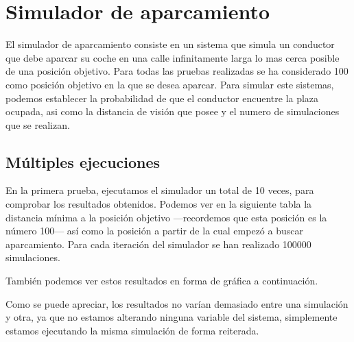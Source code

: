 \chapter{Simulador de aparcamiento}
El simulador de aparcamiento consiste en un sistema que simula un conductor que debe aparcar su coche en una calle infinitamente larga lo mas cerca posible de una posición objetivo. Para todas las pruebas realizadas se ha considerado 100 como posición objetivo en la que se desea aparcar. Para simular este sistemas, podemos establecer la probabilidad de que el conductor encuentre la plaza ocupada, asi como la distancia de visión que posee y el numero de simulaciones que se realizan.
\section{Múltiples ejecuciones}
En la primera prueba, ejecutamos el simulador un total de 10 veces, para comprobar los resultados obtenidos. Podemos ver en la siguiente tabla la distancia mínima a la posición objetivo ---recordemos que esta posición es la número 100--- así como la posición a partir de la cual empezó a buscar aparcamiento. Para cada iteración del simulador se han realizado 100000 simulaciones.
\begin{table}[h]
\centering
{}
\end{table}

También podemos ver estos resultados en forma de gráfica a continuación.

Como se puede apreciar, los resultados no varían demasiado entre una simulación y otra, ya que no estamos alterando ninguna variable del sistema, simplemente estamos ejecutando la misma simulación de forma reiterada.

